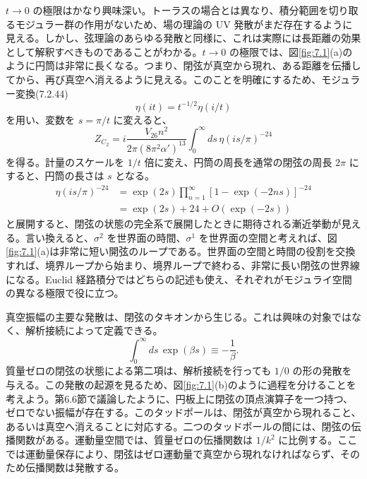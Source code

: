 $t\to0$ の極限はかなり興味深い。トーラスの場合とは異なり、積分範囲を切り取るモジュラー群の作用がないため、場の理論の UV 発散がまだ存在するように見える。しかし、弦理論のあらゆる発散と同様に、これは実際には長距離の効果として解釈すべきものであることがわかる。$t\to0$ の極限では、図\ref{fig:7.1}(a)のように円筒は非常に長くなる。つまり、閉弦が真空から現れ、ある距離を伝播してから、再び真空へ消えるように見える。このことを明確にするため、モジュラー変換(7.2.44)
\begin{equation}
\eta(it)=t^{-1/2}\eta(i/t)
\tag{7.4.2}\label{eq:7.4.2}
\end{equation}
を用い、変数を $s=\pi/t$ に変えると、
\begin{equation}
Z_{C_2}=i\frac{V_{26}n^2}{2\pi(8\pi^2\alpha')^{13}}
\int_0^\infty ds\,\eta(is/\pi)^{-24}
\tag{7.4.3}\label{eq:7.4.3}
\end{equation}
を得る。計量のスケールを $1/t$ 倍に変え、円筒の周長を通常の閉弦の周長 $2\pi$ にすると、円筒の長さは $s$ となる。
\begin{equation}
\begin{aligned}
\eta(is/\pi)^{-24}
&=\exp(2s)\prod_{n=1}^{\infty}[1-\exp(-2ns)]^{-24}\\
&=\exp(2s)+24+O(\exp(-2s))
\end{aligned}
\tag{7.4.4}\label{eq:7.4.4}
\end{equation}
と展開すると、閉弦の状態の完全系で展開したときに期待される漸近挙動が見える。言い換えると、$\sigma^2$ を世界面の時間、$\sigma^1$ を世界面の空間と考えれば、図\ref{fig:7.1}(a)は非常に短い開弦のループである。世界面の空間と時間の役割を交換すれば、境界ループから始まり、境界ループで終わる、非常に長い閉弦の世界線になる。Euclid 経路積分ではどちらの記述も使え、それぞれがモジュライ空間の異なる極限で役に立つ。

真空振幅の主要な発散は、閉弦のタキオンから生じる。これは興味の対象ではなく、解析接続によって定義できる。
\begin{equation}
\int_0^\infty ds\,\exp(\beta s)\equiv-\frac1\beta.
\tag{7.4.5}\label{eq:7.4.5}
\end{equation}
質量ゼロの閉弦の状態による第二項は、解析接続を行っても $1/0$ の形の発散を与える。この発散の起源を見るため、図\ref{fig:7.1}(b)のように過程を分けることを考えよう。第6.6節で議論したように、円板上に閉弦の頂点演算子を一つ持つ、ゼロでない振幅が存在する。このタッドポールは、閉弦が真空から現れること、あるいは真空へ消えることに対応する。二つのタッドポールの間には、閉弦の伝播関数がある。運動量空間では、質量ゼロの伝播関数は $1/k^2$ に比例する。ここでは運動量保存により、閉弦はゼロ運動量で真空から現れなければならず、そのため伝播関数は発散する。

